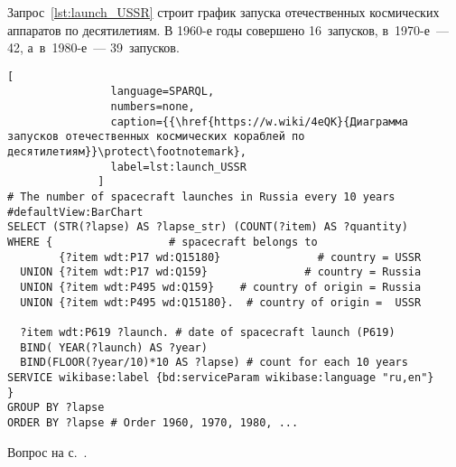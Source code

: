 \newpage
\begin{task}
\label{answer:launches_USSR}
Запрос~\ref{lst:launch_USSR} строит график запуска отечественных космических аппаратов по десятилетиям.
    В 1960-е годы совершено 16~запусков, в~1970-е~--- 42, а~в~1980-е~--- 39~запусков.

\begin{lstlisting}[ 
                language=SPARQL, 
                numbers=none, 
                caption={{\href{https://w.wiki/4eQK}{Диаграмма запусков отечественных космических кораблей по десятилетиям}}\protect\footnotemark}, 
                label=lst:launch_USSR
              ]
# The number of spacecraft launches in Russia every 10 years
#defaultView:BarChart
SELECT (STR(?lapse) AS ?lapse_str) (COUNT(?item) AS ?quantity)
WHERE {                  # spacecraft belongs to
        {?item wdt:P17 wd:Q15180}               # country = USSR
  UNION {?item wdt:P17 wd:Q159}               # country = Russia
  UNION {?item wdt:P495 wd:Q159}    # country of origin = Russia
  UNION {?item wdt:P495 wd:Q15180}.  # country of origin =  USSR
  
  ?item wdt:P619 ?launch. # date of spacecraft launch (P619)
  BIND( YEAR(?launch) AS ?year) 
  BIND(FLOOR(?year/10)*10 AS ?lapse) # count for each 10 years
SERVICE wikibase:label {bd:serviceParam wikibase:language "ru,en"}
} 
GROUP BY ?lapse
ORDER BY ?lapse # Order 1960, 1970, 1980, ...
\end{lstlisting}

\small{\AnswerBackref Вопрос на с.~\pageref{question:spacecraft_1}.}
\end{task}


